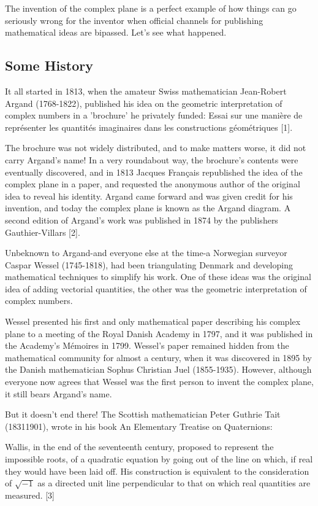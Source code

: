 \documentclass[10pt]{article}
\begin{document}
The invention of the complex plane is a perfect example of how things can go seriously wrong for the inventor when official channels for publishing mathematical ideas are bipassed. Let's see what happened.

\subsection{Some History}
It all started in 1813, when the amateur Swiss mathematician Jean-Robert Argand (1768-1822), published his idea on the geometric interpretation of complex numbers in a 'brochure' he privately funded: Essai sur une manière de représenter les quantités imaginaires dans les constructions géométriques [1].

The brochure was not widely distributed, and to make matters worse, it did not carry Argand's name! In a very roundabout way, the brochure's contents were eventually discovered, and in 1813 Jacques Français republished the idea of the complex plane in a paper, and requested the anonymous author of the original idea to reveal his identity. Argand came forward and was given credit for his invention, and today the complex plane is known as the Argand diagram. A second edition of Argand's work was published in 1874 by the publishers Gauthier-Villars [2].

Unbeknown to Argand-and everyone else at the time-a Norwegian surveyor Caspar Wessel (1745-1818), had been triangulating Denmark and developing mathematical techniques to simplify his work. One of these ideas was the original idea of adding vectorial quantities, the other was the geometric interpretation of complex numbers.

Wessel presented his first and only mathematical paper describing his complex plane to a meeting of the Royal Danish Academy in 1797, and it was published in the Academy's Mémoires in 1799. Wessel's paper remained hidden from the mathematical community for almost a century, when it was discovered in 1895 by the Danish mathematician Sophus Christian Juel (1855-1935). However, although everyone now agrees that Wessel was the first person to invent the complex plane, it still bears Argand's name.

But it doesn't end there! The Scottish mathematician Peter Guthrie Tait (18311901), wrote in his book An Elementary Treatise on Quaternions:

Wallis, in the end of the seventeenth century, proposed to represent the impossible roots, of a quadratic equation by going out of the line on which, if real they would have been laid off. His construction is equivalent to the consideration of $\sqrt{-1}$ as a directed unit line perpendicular to that on which real quantities are measured. [3]
\end{document}
